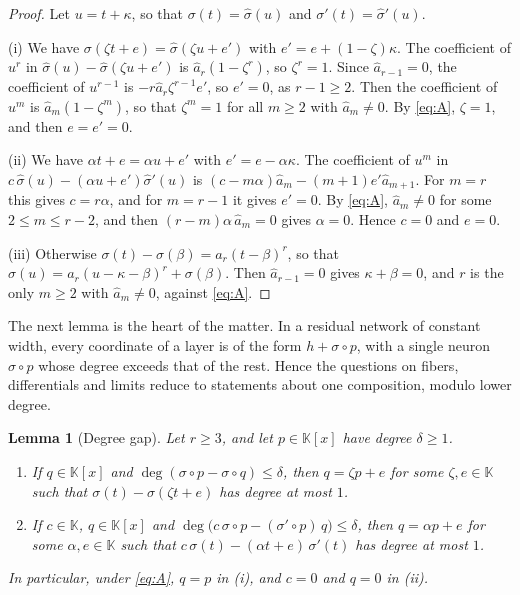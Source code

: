 \documentclass[11pt]{article}
\newtheorem{lemma}{Lemma}
\theoremstyle{definition}
\theoremstyle{remark}
\newcommand{\K}{\mathbb{K}}
\newcommand{\hs}{\hat\sigma}
\newcommand{\ha}{\hat a}
\begin{document}
\begin{proof}
Let $u=t+\kappa$, so that $\sigma(t)=\hs(u)$ and $\sigma'(t)=\hs'(u)$.

(i) We have $\sigma(\zeta t+e)=\hs(\zeta u+e')$ with $e'=e+(1-\zeta)\kappa$. The coefficient of $u^r$ in $\hs(u)-\hs(\zeta u+e')$ is $\ha_r(1-\zeta^r)$, so $\zeta^r=1$. Since $\ha_{r-1}=0$, the coefficient of $u^{r-1}$ is $-r\ha_r\zeta^{r-1}e'$, so $e'=0$, as $r-1\ge2$. Then the coefficient of $u^m$ is $\ha_m(1-\zeta^m)$, so that $\zeta^m=1$ for all $m\ge2$ with $\ha_m\ne0$. By \eqref{eq:A}, $\zeta=1$, and then $e=e'=0$.

(ii) We have $\alpha t+e=\alpha u+e'$ with $e'=e-\alpha\kappa$. The coefficient of $u^m$ in $c\,\hs(u)-(\alpha u+e')\hs'(u)$ is $(c-m\alpha)\ha_m-(m+1)e'\ha_{m+1}$. For $m=r$ this gives $c=r\alpha$, and for $m=r-1$ it gives $e'=0$. By \eqref{eq:A}, $\ha_m\ne0$ for some $2\le m\le r-2$, and then $(r-m)\alpha\,\ha_m=0$ gives $\alpha=0$. Hence $c=0$ and $e=0$.

(iii) Otherwise $\sigma(t)-\sigma(\beta)=a_r(t-\beta)^r$, so that $\hs(u)=a_r(u-\kappa-\beta)^r+\sigma(\beta)$. Then $\ha_{r-1}=0$ gives $\kappa+\beta=0$, and $r$ is the only $m\ge2$ with $\ha_m\ne0$, against \eqref{eq:A}.
\end{proof}

The next lemma is the heart of the matter. In a residual network of constant width, every coordinate of a layer is of the form $h+\sigma\circ p$, with a single neuron $\sigma\circ p$ whose degree exceeds that of the rest. Hence the questions on fibers, differentials and limits reduce to statements about one composition, modulo lower degree.

\begin{lemma}[Degree gap]\label{lem:gap}
Let $r\ge3$, and let $p\in\K[x]$ have degree $\delta\ge1$.
\begin{enumerate}[label=\textup{(\roman*)},nosep]
\item If $q\in\K[x]$ and $\deg(\sigma\circ p-\sigma\circ q)\le\delta$, then $q=\zeta p+e$ for some $\zeta,e\in\K$ such that $\sigma(t)-\sigma(\zeta t+e)$ has degree at most $1$.
\item If $c\in\K$, $q\in\K[x]$ and $\deg\big(c\,\sigma\circ p-(\sigma'\circ p)\,q\big)\le\delta$, then $q=\alpha p+e$ for some $\alpha,e\in\K$ such that $c\,\sigma(t)-(\alpha t+e)\,\sigma'(t)$ has degree at most $1$.
\end{enumerate}
In particular, under \eqref{eq:A}, $q=p$ in \textup{(i)}, and $c=0$ and $q=0$ in \textup{(ii)}.
\end{lemma}
\end{document}
